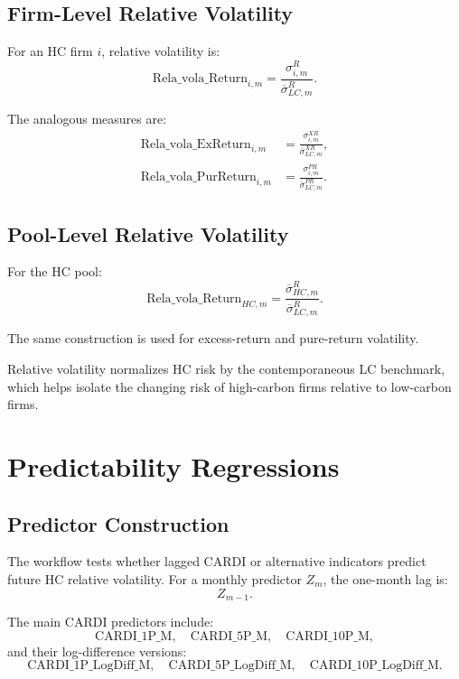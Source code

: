 \documentclass[11pt]{article}
\begin{document}
\subsection{Firm-Level Relative Volatility}

For an HC firm \(i\), relative volatility is:
\begin{equation}
\mathrm{Rela\_vola\_Return}_{i,m}
=
\frac{\sigma^R_{i,m}}
{\overline{\sigma}^{R}_{LC,m}}.
\end{equation}

The analogous measures are:
\begin{align}
\mathrm{Rela\_vola\_ExReturn}_{i,m}
&=
\frac{\sigma^{XR}_{i,m}}
{\overline{\sigma}^{XR}_{LC,m}},\\
\mathrm{Rela\_vola\_PurReturn}_{i,m}
&=
\frac{\sigma^{PR}_{i,m}}
{\overline{\sigma}^{PR}_{LC,m}}.
\end{align}

\subsection{Pool-Level Relative Volatility}

For the HC pool:
\begin{equation}
\mathrm{Rela\_vola\_Return}_{HC,m}
=
\frac{\overline{\sigma}^{R}_{HC,m}}
{\overline{\sigma}^{R}_{LC,m}}.
\end{equation}

The same construction is used for excess-return and pure-return volatility.

Relative volatility normalizes HC risk by the contemporaneous LC benchmark,
which helps isolate the changing risk of high-carbon firms relative to low-carbon
firms.

\section{Predictability Regressions}

\subsection{Predictor Construction}

The workflow tests whether lagged CARDI or alternative indicators predict
future HC relative volatility. For a monthly predictor \(Z_m\), the one-month
lag is:
\begin{equation}
Z_{m-1}.
\end{equation}

The main CARDI predictors include:
\[
\mathrm{CARDI\_1P\_M},\quad
\mathrm{CARDI\_5P\_M},\quad
\mathrm{CARDI\_10P\_M},
\]
and their log-difference versions:
\[
\mathrm{CARDI\_1P\_LogDiff\_M},\quad
\mathrm{CARDI\_5P\_LogDiff\_M},\quad
\mathrm{CARDI\_10P\_LogDiff\_M}.
\]
\end{document}
